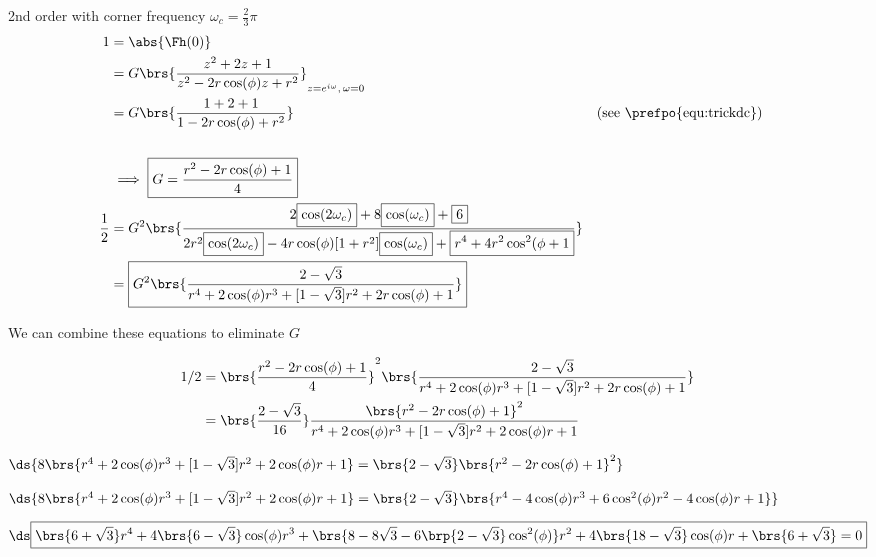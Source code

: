 \begin{example}2nd order  with corner frequency $\omega_c=\frac{2}{3}\pi$
\begin{align*}
  1 &= \abs{\Fh(0)}
  \\&= G\brs{\frac{z^2 + 2z            + 1}
                  {z^2 - 2r\cos(\phi)z + r^2}}_{z=e^{i\omega},\,\omega=0}
  \\&= G\brs{\frac{1   + 2             + 1}
                  {1   - 2r\cos(\phi)  + r^2}}
    && \text{(see \prefpo{equ:trickdc})}
  \\
  \\&\implies \boxed{G = \frac{r^2 - 2r\cos(\phi) + 1}{4}}
  \\
  \frac{1}{2}
  &= G^2\brs {
         \frac{2   \boxed{\cos(2\omega_c)}  + 8                  \boxed{\cos(\omega_c)} +  \boxed{6}}
              {2r^2\boxed{\cos(2\omega_c)}  - 4r\cos(\phi)[1+r^2]\boxed{\cos(\omega_c)} +  \boxed{r^4 +  4r^2\cos^2(\phi + 1}}
             }
\\&= \boxed{G^2\brs {
         \frac{2-\sqrt{3}}
              {r^4 + 2\cos(\phi)r^3  + [1-\sqrt{3}]r^2  + 2r\cos(\phi) + 1}
              }}
\end{align*}

{  We can combine these equations to eliminate $G$}


\begin{align*}
1/2
  &= \brs{\frac{r^2 - 2r\cos(\phi) + 1}{4}}^2
     \brs{\frac{2-\sqrt{3}}
               {r^4 + 2\cos(\phi)r^3  + [1-\sqrt{3}]r^2  + 2r\cos(\phi) + 1}}
\\&= \brs{\frac{2-\sqrt{3}}{16}}
     \frac{\brs{r^2 - 2r\cos(\phi) + 1}^2}
          {r^4 + 2\cos(\phi)r^3  + [1-\sqrt{3}]r^2  + 2\cos(\phi)r + 1}
\end{align*}

$\ds{
8\brs{r^4 + 2\cos(\phi)r^3  + [1-\sqrt{3}]r^2  + 2\cos(\phi)r + 1}
   = \brs{2-\sqrt{3}} \brs{r^2 - 2r\cos(\phi) + 1}^2
}$

$\ds{
8\brs{r^4 + 2\cos(\phi)r^3  + [1-\sqrt{3}]r^2  + 2\cos(\phi)r + 1}
   = \brs{2-\sqrt{3}} \brs{r^4 - 4\cos(\phi)r^3 + 6\cos^2(\phi)r^2 -4\cos(\phi)r  + 1}
}$

$\ds\boxed{
    \brs{6+\sqrt{3}}r^4
 + 4\brs{6-\sqrt{3}}\cos(\phi)r^3
 + \brs{8-8\sqrt{3}- 6\brp{2-\sqrt{3}}\cos^2(\phi)}r^2
 + 4\brs{18-\sqrt{3}}\cos(\phi)r
 +\brs{6+\sqrt{3}}
 =0
}$

\end{example}
